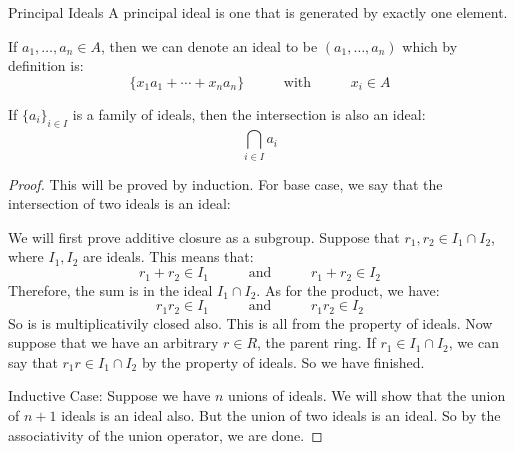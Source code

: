 \documentclass{report}
\begin{document}
\begin{definition}{Principal Ideals}
    A principal ideal is one that is generated by exactly one element.
\end{definition}

If $a_{1}, \ldots, a_{n} \in A$, then we can denote an ideal to be $(a_{1}, \ldots, a_{n})$ which by definition is:
    \begin{equation*}
        \{x_{1}a_{1} + \cdots + x_{n}a_{n}\} \hspace{30pt} \text{ with } \hspace{30pt} x_{i} \in A
    \end{equation*}

If $\{a_{i}\}_{i \in I}$ is a family of ideals, then the intersection is also an ideal:
    \begin{equation*}
        \bigcap_{i \in I}^{} a_{i}
    \end{equation*}
    \begin{proof}
        This will be proved by induction. For base case, we say that the intersection of two ideals is an ideal:

            We will first prove additive closure as a subgroup. Suppose that $r_{1}, r_{2} \in I_{1} \cap I_{2}$, where $I_{1}, I_{2}$ are ideals. This means that:
                \begin{equation*}
                    r_{1} + r_{2} \in I_{1} \hspace{30pt} \text{ and } \hspace{30pt} r_{1} + r_{2} \in I_{2}
                \end{equation*}
            Therefore, the sum is in the ideal $I_{1} \cap I_{2}$. As for the product, we have:
                \begin{equation*}
                    r_{1}r_{2} \in I_{1} \hspace{30pt} \text{ and } \hspace{30pt} r_{1}r_{2} \in I_{2}
                \end{equation*}
            So is is multiplicativily closed also. This is all from the property of ideals. Now suppose that we have an arbitrary $r \in R$, the parent ring. If $r_{1} \in I_{1} \cap  I_{2}$, we can say that $r_{1}r \in I_{1} \cap I_{2}$ by the property of ideals. So we have finished.

            Inductive Case: Suppose we have $n$ unions of ideals. We will show that the union of $n + 1$ ideals is an ideal also. But the union of two ideals is an ideal. So by the associativity of the union operator, we are done.
    \end{proof}
\end{document}
